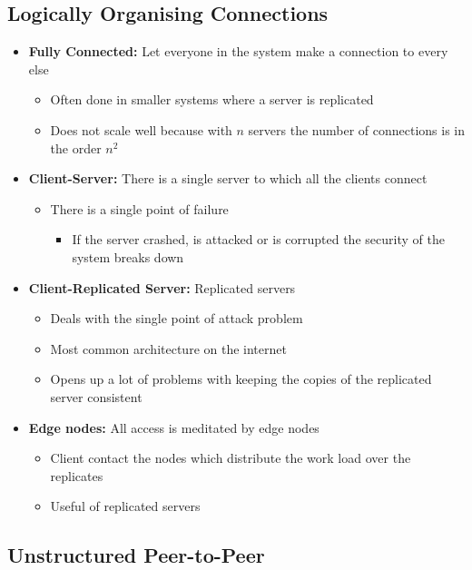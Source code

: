 \documentclass[11pt]{article}
\begin{document}
\subsection{Logically Organising Connections}
\label{sec:org7e57b9b}
\begin{itemize}
\item \textbf{Fully Connected:} Let everyone in the system make a connection to every else
\begin{itemize}
\item Often done in smaller systems where a server is replicated
\item Does not scale well because with \(n\) servers the number of connections is in the order \(n^2\)
\end{itemize}

\item \textbf{Client-Server:} There is a single server to which all the clients connect
\begin{itemize}
\item There is a single point of failure
\begin{itemize}
\item If the server crashed, is attacked or is corrupted the security of the system breaks down
\end{itemize}
\end{itemize}

\item \textbf{Client-Replicated Server:} Replicated servers
\begin{itemize}
\item Deals with the single point of attack problem
\item Most common architecture on the internet
\item Opens up a lot of problems with keeping the copies of the replicated server consistent
\end{itemize}

\item \textbf{Edge nodes:} All access is meditated by edge nodes
\begin{itemize}
\item Client contact the nodes which distribute the work load over the replicates
\item Useful of replicated servers
\end{itemize}
\end{itemize}

\subsection{Unstructured Peer-to-Peer}
\label{sec:orga589cc6}
\end{document}
